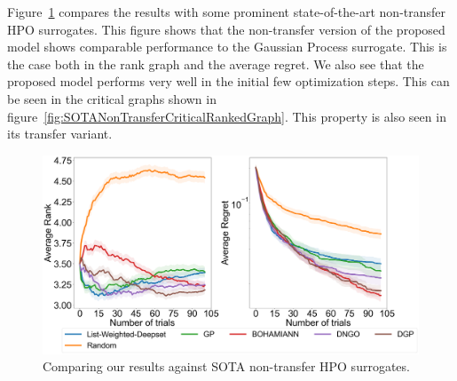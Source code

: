 \documentclass[12pt, twoside, ngerman]{report}
\begin{document}
Figure~\ref{fig:NonTransferSOTA} compares the results with some prominent state-of-the-art non-transfer HPO surrogates. This figure shows that the non-transfer version of the proposed model shows comparable performance to the Gaussian Process surrogate. This is the case both in the rank graph and the average regret. We also see that the proposed model performs very well in the initial few optimization steps. This can be seen in the critical graphs shown in figure~\ref{fig:SOTANonTransferCriticalRankedGraph}. This property is also seen in its transfer variant.

\begin{figure}[h]
  \centering
    \includegraphics[scale=0.25]{images/NonTransferSOAT}
    \caption{Comparing our results against SOTA non-transfer HPO surrogates.}
    \label{fig:NonTransferSOTA}
\end{figure}
\end{document}
